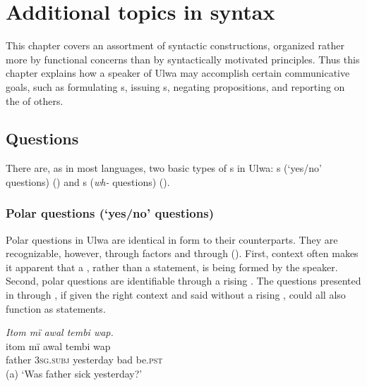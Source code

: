 \chapter{Additional topics in syntax}\label{sec:13}


This chapter covers an assortment of syntactic constructions, organized rather more by functional concerns than by syntactically motivated principles. Thus this chapter explains how a speaker of Ulwa may accomplish certain communicative goals, such as formulating s, issuing s,  negating propositions, and reporting on the  of others.


\section{Questions}\label{sec:13.1}



There are, as in most languages, two basic types of s in Ulwa: s (‘yes/no’ questions) () and s (\textit{wh-} questions) ().


\subsection{Polar questions (‘yes/no’ questions)}\label{sec:13.1.1}


Polar questions in Ulwa are identical in form to their  counterparts. They are recognizable, however, through  factors and through  (). First, context often makes it apparent that a , rather than a statement, is being formed by the speaker. Second, polar questions are identifiable through a rising . The questions presented in  through , if given the right context and said without a rising , could all also function as statements.

\ea%
    \label{ex:syntax:1}
            \textit{Itom mï awal tembi wap.}\\
\gll    itom  mï      awal    tembi  wap\\
    father  \textsc{3sg.subj}  yesterday  bad    be.\textsc{pst}\\
\glt    (a) ‘Was father sick yesterday?’

